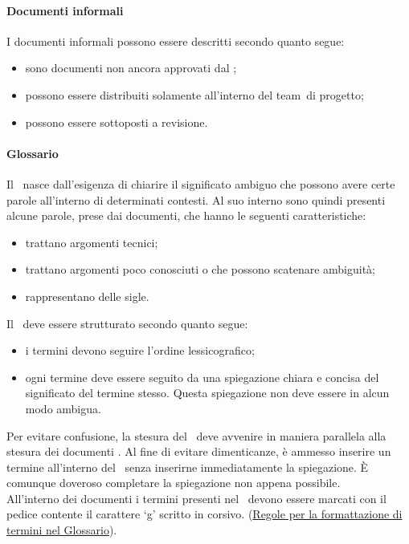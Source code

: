 \documentclass[../NormeProgetto.text]{subfiles}
\begin{document}
		\paragraph{Documenti informali}
			I documenti informali possono essere descritti secondo quanto segue:
			\begin{itemize}
				\item sono documenti non ancora approvati dal \responsabilediprogetto;
				\item possono essere distribuiti solamente all'interno del team\g\ di progetto;
				\item possono essere sottoposti a revisione.
			\end{itemize}
		
		\paragraph{Glossario} \label{sec:Glossario}
			Il \glossario\ nasce dall'esigenza di chiarire il significato ambiguo che possono avere certe parole all'interno di determinati contesti. Al suo interno sono quindi presenti alcune parole, prese dai documenti, che hanno le seguenti caratteristiche:
			\begin{itemize}
				\item trattano argomenti tecnici;
				\item trattano argomenti poco conosciuti o che possono scatenare ambiguità;
				\item rappresentano delle sigle.
			\end{itemize}
			Il \glossario\ deve essere strutturato secondo quanto segue:
			\begin{itemize}
				\item i termini devono seguire l'ordine lessicografico;
				\item ogni termine deve essere seguito da una spiegazione chiara e concisa del significato del termine stesso. Questa spiegazione non deve essere in alcun modo ambigua.
			\end{itemize}
			Per evitare confusione, la stesura del \glossario\ deve avvenire in maniera parallela alla stesura dei documenti . Al fine di evitare dimenticanze, è ammesso inserire un termine all'interno del \glossario\ senza inserirne immediatamente la spiegazione. È comunque doveroso completare la spiegazione non appena possibile. \\ All'interno dei documenti i termini presenti nel \glossario\ devono essere marcati con il pedice contente il carattere `g' scritto in corsivo. (\hyperref[sec:Formattazione termini nel glossario]{Regole per la formattazione di termini nel Glossario}).
		
\end{document}
